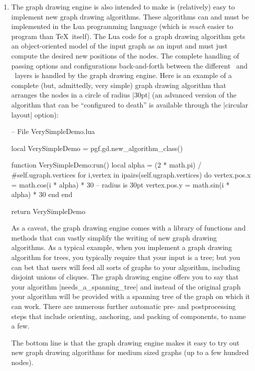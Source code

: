 \begin{enumerate}
\begin{codeexample}[]
{  \draw (node 1) edge (node 2)
        (node 2) edge (node 3)
                 edge (node 4)
        (node 3) edge (node 4)
                 edge (node 5)
                 edge (node 6);
}
\end{codeexample}
  In all of the example, the positions of the nodes have only been
  computed \emph{after} all nodes have been created and the edges have
  been specified. For instance, in the last example, without the
  option |spring electrical layout|, all of the nodes would have been
  placed on top of each other.
\item The graph drawing engine is also intended to make is
  (relatively) easy to implement new graph drawing algorithms. These
  algorithms can and must be implemented in the Lua programming
  language (which is \emph{much} easier to program than \TeX\
  itself). The Lua code for a graph drawing algorithm gets an
  object-oriented model of the input graph as an input and must just
  compute the desired new positions of the nodes. The complete
  handling of passing options and configurations back-and-forth
  between the different \tikzname\ and \pgfname\ layers is handled by
  the graph drawing engine. Here is an example of a complete (but,
  admittedly, very simple) graph drawing algorithm that arranges the
  nodes in a circle of radius |30pt| (an advanced version of the
  algorithm that can be ``configured to death'' is available through
  the |circular layout| option): 
\begin{codeexample}
-- File VerySimpleDemo.lua

local VerySimpleDemo = pgf.gd.new_algorithm_class()

function VerySimpleDemo:run()
  local alpha = (2 * math.pi) / #self.ugraph.vertices
  for i,vertex in ipairs(self.ugraph.vertices) do
    vertex.pos.x = math.cos(i * alpha) * 30  -- radius is 30pt
    vertex.pos.y = math.sin(i * alpha) * 30
  end
end

return VerySimpleDemo      
\end{codeexample}

  As a caveat, the graph drawing engine comes with a library of
  functions and methods that can vastly simplify the writing of new
  graph drawing algorithms. As a typical example, when you implement a 
  graph drawing algorithm for trees, you typically require that your
  input is a tree; but you can bet that users will feed all sorts of
  graphs to your algorithm, including disjoint unions of cliques. The
  graph drawing engine offers you to say that your algorithm
  |needs_a_spanning_tree| and instead of the original graph your
  algorithm will be provided with a spanning tree of the graph on
  which it can work. There are numerous further automatic pre- and
  postprocessing steps that include orienting, anchoring, and packing
  of components, to name a few.
  
  The bottom line is that the graph drawing engine makes it easy
  to try out new graph drawing algorithms for medium sized graphs (up
  to a few hundred nodes).
\end{enumerate}

